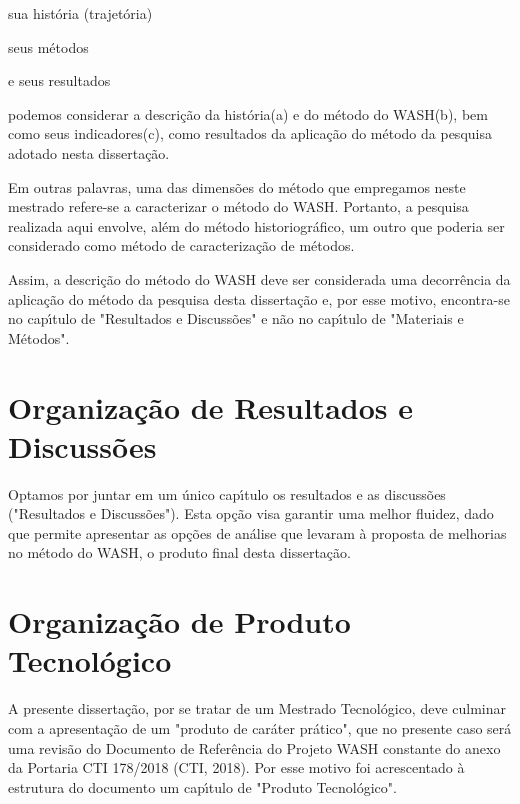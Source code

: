 \documentclass[
12pt,		%
openright,	%
twoside,  %
a4paper,			%
chapter=TITLE,		%
english,			%
french,				%
spanish,			%
brazil				%
]{USPSC-classe/USPSC}
\begin{document}
\begin{alineas}
\item sua hist\'oria (trajet\'oria)
\item seus m\'etodos
\item e seus resultados
\end{alineas}

podemos considerar a descri\c{c}\~ao da hist\'oria(a) e do m\'etodo do WASH(b), bem como seus indicadores(c), como resultados da aplica\c{c}\~ao do m\'etodo da pesquisa adotado nesta disserta\c{c}\~ao.


Em outras palavras, uma das dimens\~oes do m\'etodo que empregamos neste mestrado refere-se a caracterizar o m\'etodo do WASH. Portanto, a pesquisa realizada aqui envolve, al\'em do m\'etodo historiogr\'afico, um outro que poderia ser considerado como m\'etodo de caracteriza\c{c}\~ao de m\'etodos.


Assim, a descri\c{c}\~ao do m\'etodo do WASH deve ser considerada uma decorr\^encia da aplica\c{c}\~ao do m\'etodo da pesquisa desta disserta\c{c}\~ao e, por esse motivo, encontra-se no cap\'{\i}tulo de "Resultados e Discuss\~oes" e n\~ao no cap\'{\i}tulo de "Materiais e M\'etodos".


\section[Organiza\c{c}\~ao de Resultados e Discuss\~oes]{Organiza\c{c}\~ao de Resultados e Discuss\~oes}\label{Organiza\c{c}\~ao de Resultados e Discuss\~oes}
Optamos por juntar em um \'unico cap\'{\i}tulo os resultados e as discuss\~oes ("Resultados e Discuss\~oes"). Esta op\c{c}\~ao visa garantir uma melhor fluidez, dado que permite apresentar as op\c{c}\~oes de an\'alise que levaram \`a proposta de melhorias no m\'etodo do WASH, o produto final desta disserta\c{c}\~ao.


\section[Organiza\c{c}\~ao de Produto Tecnol\'ogico]{Organiza\c{c}\~ao de Produto Tecnol\'ogico}\label{Organiza\c{c}\~ao de Produto Tecnol\'ogico}
A presente disserta\c{c}\~ao, por se tratar de um Mestrado Tecnol\'ogico, deve culminar com a apresenta\c{c}\~ao de um "produto de car\'ater pr\'atico", que no presente caso ser\'a uma revis\~ao do Documento de Refer\^encia do Projeto WASH  constante do anexo da  Portaria CTI 178/2018 (CTI, 2018). Por esse motivo foi acrescentado \`a estrutura do documento um cap\'{\i}tulo de "Produto Tecnol\'ogico".
\end{document}
